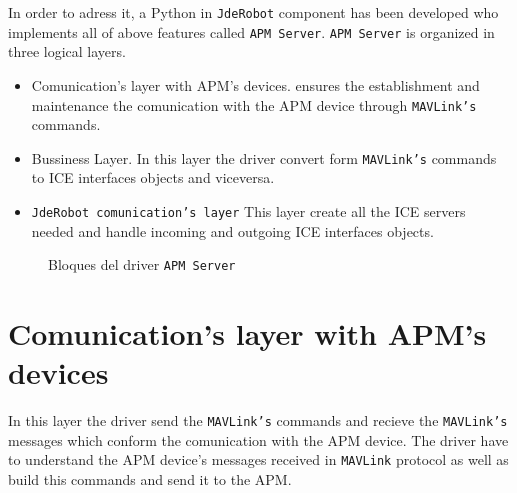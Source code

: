 In order to adress it, a Python in \texttt{JdeRobot} component has been developed who implements all of above features called \texttt{APM Server}. 
\texttt{APM Server} is organized in three logical layers.
\begin{itemize}
\item Comunication's layer with APM's devices. ensures the establishment and maintenance the comunication with the APM device through \texttt{MAVLink's} commands.
\item Bussiness Layer. In this layer the driver convert form \texttt{MAVLink's} commands to ICE interfaces objects and viceversa.
\item \texttt{JdeRobot comunication's layer} This layer create all the ICE servers needed and handle incoming and outgoing ICE interfaces objects.
\end{itemize}
\begin{figure}[h]
    \caption{Bloques del driver \texttt{APM Server}}
  
\end{figure}

\section{Comunication's layer with APM's devices}
\label{sec:apm_comunication}

In this layer the driver send the \texttt{MAVLink's} commands and recieve the \texttt{MAVLink's} messages which conform the comunication with the APM device.
The driver have to understand the APM device's messages received in \texttt{MAVLink} protocol as well as build this commands and send it to the APM.

